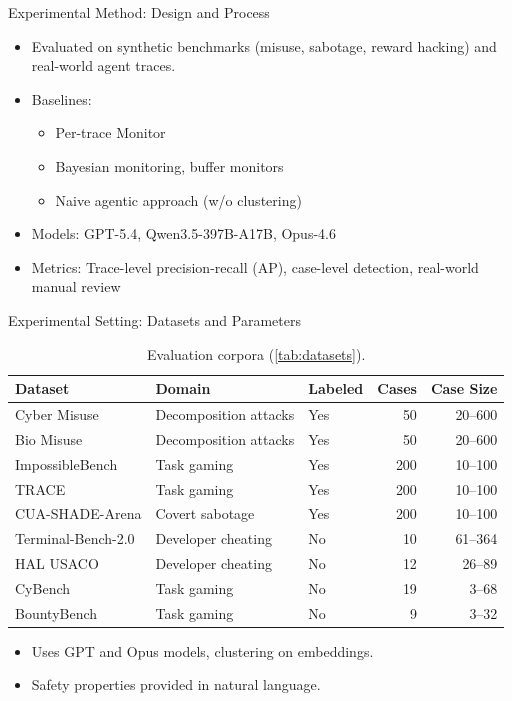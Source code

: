 \documentclass{beamer}
\newcommand{\alertterm}[1]{\alert{#1}}
\begin{document}
\begin{frame}{Experimental Method: Design and Process}
\begin{itemize}
    \item Evaluated on \alertterm{synthetic benchmarks} (misuse, sabotage, reward hacking) and \alertterm{real-world agent traces}.
    \item Baselines:
    \begin{itemize}
        \item Per-trace \alertterm{Monitor}
        \item \alertterm{Bayesian monitoring}, buffer monitors
        \item Naive agentic approach (w/o clustering)
    \end{itemize}
    \item Models: GPT-5.4, Qwen3.5-397B-A17B, Opus-4.6
    \item Metrics: Trace-level precision-recall (AP), case-level detection, real-world manual review
\end{itemize}
\end{frame}
\begin{frame}{Experimental Setting: Datasets and Parameters}
\begin{table}[!ht]
\centering
\tiny
\begin{tabular}{@{}lllrr@{}}
\toprule
Dataset & Domain & Labeled & Cases & Case Size\\
\midrule
Cyber Misuse & Decomposition attacks & Yes & 50 & 20--600\\
Bio Misuse & Decomposition attacks & Yes & 50 & 20--600\\
ImpossibleBench & Task gaming & Yes & 200 & 10--100\\
TRACE & Task gaming & Yes & 200 & 10--100\\
CUA-SHADE-Arena & Covert sabotage & Yes & 200 & 10--100\\
Terminal-Bench-2.0 & Developer cheating & No & 10 & 61--364\\
HAL USACO & Developer cheating & No & 12 & 26--89\\
CyBench & Task gaming & No & 19 & 3--68\\
BountyBench & Task gaming & No & 9 & 3--32\\
\bottomrule
\end{tabular}
\caption{Evaluation corpora (\autoref{tab:datasets}).}
\label{tab:datasets}
\end{table}
\begin{itemize}
    \item Uses \alertterm{GPT} and \alertterm{Opus} models, clustering on embeddings.
    \item Safety properties provided in natural language.
\end{itemize}
\end{frame}
\end{document}
